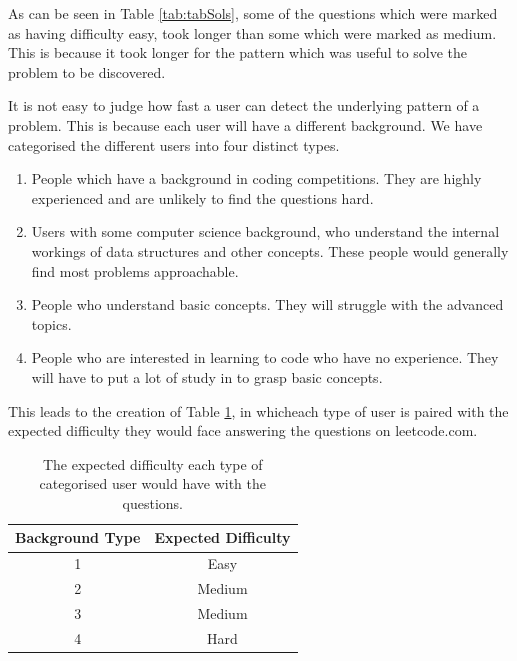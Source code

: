 \documentclass[10pt,twocolumn]{IEEEtran}
\begin{document}
\par As can be seen in Table \ref{tab:tabSols}, some of the questions which were marked as having difficulty easy, took longer than some which were marked as medium. This is because it took longer for the pattern which was useful to solve the problem to be discovered.
\par It is not easy to judge how fast a user can detect the underlying pattern of a problem. This is because each user will have a different background. We have categorised the different users into four distinct types. 
\begin{enumerate}
\item{People which have a background in coding competitions. They are highly experienced and are unlikely to find the questions hard.}
\item{Users with some computer science background, who understand the internal workings of data structures and other concepts. These people would generally find most problems approachable.}
\item{People who understand basic concepts. They will struggle with the advanced topics.}
\item{People who are interested in learning to code who have no experience. They will have to put a lot of study in to grasp basic concepts.}
\end{enumerate}
This leads to the creation of Table \ref{tab:difficulty}, in whicheach type of user is paired with the expected difficulty they would face answering the questions on leetcode.com. 
\begin{table}[t]
\centering
	\begin{tabular}{| c | c |} \hline
		   Background Type &Expected Difficulty \\ \hline
		1 & Easy \\ \hline
		2 & Medium \\ \hline
		3 & Medium  \\ \hline
		4 & Hard  \\ \hline
	\end{tabular}
	\caption{The expected difficulty each type of categorised user would have with the questions.}
	\label{tab:difficulty}
\end{table}
\end{document}
